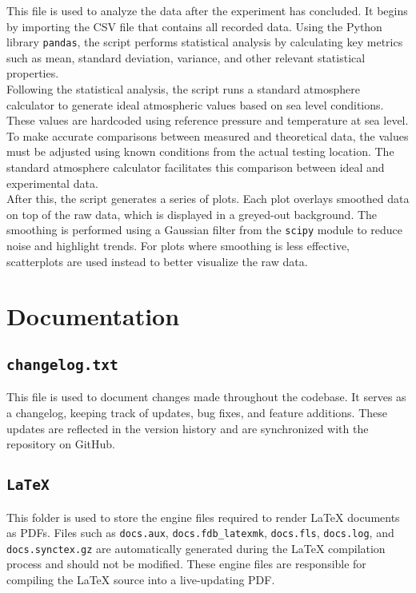 \documentclass[12pt]{report}
\begin{document}
This file is used to analyze the data after the experiment has concluded. It begins by importing the CSV file that contains all recorded data. Using the Python library \texttt{pandas}, the script performs statistical analysis by calculating key metrics such as mean, standard deviation, variance, and other relevant statistical properties. \\

Following the statistical analysis, the script runs a standard atmosphere calculator to generate ideal atmospheric values based on sea level conditions. These values are hardcoded using reference pressure and temperature at sea level. To make accurate comparisons between measured and theoretical data, the values must be adjusted using known conditions from the actual testing location. The standard atmosphere calculator facilitates this comparison between ideal and experimental data. \\

After this, the script generates a series of plots. Each plot overlays smoothed data on top of the raw data, which is displayed in a greyed-out background. The smoothing is performed using a Gaussian filter from the \texttt{scipy} module to reduce noise and highlight trends. For plots where smoothing is less effective, scatterplots are used instead to better visualize the raw data. \\


\section{Documentation}

\subsection{\texttt{changelog.txt}}
This file is used to document changes made throughout the codebase. It serves as a changelog, keeping track of updates, bug fixes, and feature additions. These updates are reflected in the version history and are synchronized with the repository on GitHub.


\subsection{\texttt{LaTeX}}
This folder is used to store the engine files required to render LaTeX documents as PDFs. Files such as \texttt{docs.aux}, \texttt{docs.fdb\_latexmk}, \texttt{docs.fls}, \texttt{docs.log}, and \texttt{docs.synctex.gz} are automatically generated during the LaTeX compilation process and should not be modified. These engine files are responsible for compiling the LaTeX source into a live-updating PDF. \\
\end{document}
